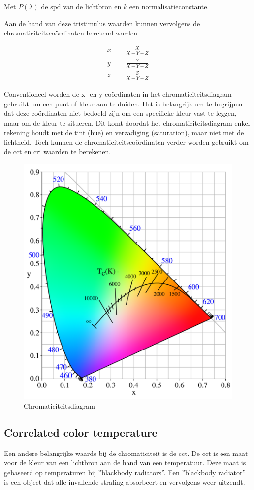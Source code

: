 Met $P(\lambda)$ de \gls{spd} van de lichtbron en $k$ een normalisatieconstante.

Aan de hand van deze tristimulus waarden kunnen vervolgens de chromaticiteitsco\"ordinaten berekend worden.

\begin{align*}
x &= \frac{X}{X + Y + Z} \\
y &= \frac{Y}{X + Y + Z} \\
z &= \frac{Z}{X + Y + Z}
\end{align*}

Conventioneel worden de x- en y-co\"ordinaten in het chromaticiteitsdiagram gebruikt om een punt of kleur aan te duiden. Het is belangrijk om te begrijpen dat deze co\"ordinaten niet bedoeld zijn om een specifieke kleur vast te leggen, maar om de kleur te situeren. Dit komt doordat het chromaticiteitsdiagram enkel rekening houdt met de tint (hue) en verzadiging (saturation), maar niet met de lichtheid. Toch kunnen de chromaticiteitsco\"ordinaten verder worden gebruikt om de \gls{cct} en \gls{cri} waarden te berekenen.

\begin{figure}[H]
    \centering
    \includegraphics[width=0.6\linewidth]{figs/PlanckianLocus.png}
    \caption{Chromaticiteitsdiagram ~\cite{Chromaticiteit2017}}%
    \label{fig:chromaticiteitsdiagram}
\end{figure}

\subsection{Correlated color temperature}

Een andere belangrijke waarde bij de chromaticiteit is de \gls{cct}. De \gls{cct} is een maat voor de kleur van een lichtbron aan de hand van een temperatuur. Deze maat is gebaseerd op temperaturen bij ''blackbody radiators''. Een ''blackbody radiator'' is een object dat alle invallende straling absorbeert en vervolgens weer uitzendt.

